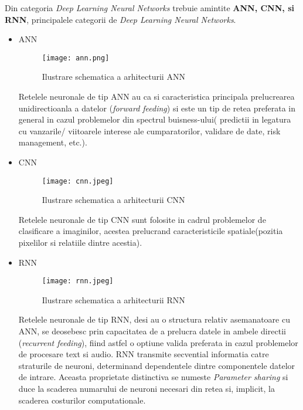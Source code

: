 \documentclass[a4paper]{article}
\begin{document}
Din categoria \textit{Deep Learning Neural
Networks} trebuie amintite \textbf{ANN, CNN, si RNN}, principalele categorii de \textit{Deep Learning Neural Networks}.
\begin{itemize}
	\label{NN}

	\item ANN

\begin{figure}[ht]
	\centering
	\texttt{[image: ann.png]}
	\caption{Ilustrare schematica a arhitecturii ANN}
\label{ANN}
\end{figure}
Retelele neuronale de tip ANN au ca si caracteristica principala prelucrearea unidirectioanla a datelor (\textit{forward feeding})
si este un tip de retea preferata in general in cazul problemelor din spectrul buisness-ului( predictii in legatura cu vanzarile/
viitoarele interese ale cumparatorilor, validare de date, risk management, etc.).

	\item CNN
\begin{figure}[ht]
	\centering
	\texttt{[image: cnn.jpeg]}
	\caption{Ilustrare schematica a arhitecturii CNN}
\label{CNN}
\end{figure}


Retelele neuronale de tip CNN sunt folosite in cadrul problemelor de clasificare a imaginilor, acestea prelucrand caracteristicile
spatiale(pozitia pixelilor si relatiile dintre acestia).

	\item RNN
\begin{figure}[ht]
	\centering
	\texttt{[image: rnn.jpeg]}
	\caption{Ilustrare schematica a arhitecturii RNN}
\label{RNN}

\end{figure}


Retelele neuronale de tip RNN, desi au o structura relativ asemanatoare cu ANN, se deosebesc prin capacitatea de a prelucra datele
in ambele directii (\textit{recurrent feeding}), fiind astfel o optiune valida preferata in cazul problemelor de procesare text
si audio. RNN transmite secvential informatia catre straturile de neuroni, determinand dependentele dintre componentele datelor
de intrare. Aceasta proprietate distinctiva se numeste \textit{Parameter sharing} si duce la scaderea numarului de neuroni necesari
din retea si, implicit, la scaderea costurilor computationale.

\end{itemize}
\end{document}
